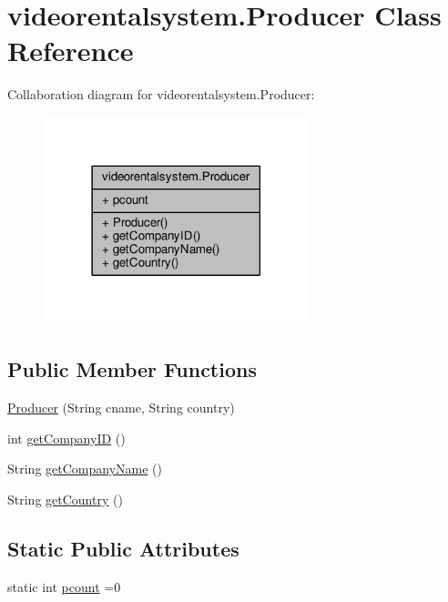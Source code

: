 \hypertarget{classvideorentalsystem_1_1Producer}{\section{videorentalsystem.\-Producer Class Reference}
\label{classvideorentalsystem_1_1Producer}
}


Collaboration diagram for videorentalsystem.\-Producer\-:
\nopagebreak
\begin{figure}[H]
\begin{center}
\leavevmode
\includegraphics[width=218pt]{classvideorentalsystem_1_1Producer__coll__graph}
\end{center}
\end{figure}
\subsection*{Public Member Functions}
\begin{DoxyCompactItemize}
\item 
\hyperlink{classvideorentalsystem_1_1Producer_a435ae0208121220644dfd1c7434874a6}{Producer} (String cname, String country)
\item 
int \hyperlink{classvideorentalsystem_1_1Producer_a3378b81bdf63bf4be39e5e6ce37fc1c3}{get\-Company\-I\-D} ()
\item 
String \hyperlink{classvideorentalsystem_1_1Producer_a576c7df98eb037be8ba5885c2dfd63fe}{get\-Company\-Name} ()
\item 
String \hyperlink{classvideorentalsystem_1_1Producer_a69158a8988c98fc2517e648cba596a27}{get\-Country} ()
\end{DoxyCompactItemize}
\subsection*{Static Public Attributes}
\begin{DoxyCompactItemize}
\item 
static int \hyperlink{classvideorentalsystem_1_1Producer_af9cea6d53da66d2161104a631a34f093}{pcount} =0
\end{DoxyCompactItemize}


